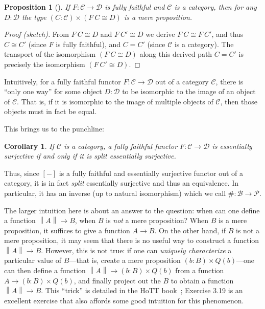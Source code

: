 \documentclass[preprint,authoryear]{sigplanconf}
\newcommand{\mcal}[1]{\ensuremath{\mathcal{#1}}}
\let\Sect\S
\renewcommand{\S}{\mcal S}
\newcommand{\iso}{\cong}              %
\newtheorem{prop}[thm]{Proposition}
\newtheorem{cor}[thm]{Corollary}
\theoremstyle{definition}
\theoremstyle{remark}
\newcommand{\sizesymb}{\#}
\newcommand{\size}[1]{\ensuremath{\sizesymb#1}}
\newcommand{\ptrunc}[1]{\ensuremath{\left\|#1\right\|}}
\newcommand{\CT}{\mcal{C}}
\newcommand{\DT}{\mcal{D}}
\newcommand{\BT}{\mcal{B}}
\newcommand{\PT}{\mcal{P}}
\newcommand{\fin}[1]{\ensuremath{[#1]}}
\begin{document}
\begin{prop}[]
  If $F : \CT \to \DT$ is fully faithful and $\CT$ is a category, then
  for any $D : \DT$ the type $(C : \CT) \times (F\ C \iso D)$ is a
  mere proposition.
\end{prop}

\begin{proof}[Proof (sketch)]
  From $F\ C \iso D$ and $F\ C' \iso D$ we derive $F\ C \iso F\
  C'$, and thus $C \iso C'$ (since $F$ is fully faithful), and $C =
  C'$ (since $\CT$ is a category).  The transport of the isomorphism
  $(F\ C \iso D)$ along this derived path $C = C'$ is precisely the
  isomorphism $(F\ C' \iso D)$.
\end{proof}

Intuitively, for a fully faithful functor $F : \CT \to \DT$ out of a
category $\CT$, there is ``only one way'' for some object $D : \DT$ to
be isomorphic to the image of an object of $\CT$.  That is, if it is
isomorphic to the image of multiple objects of $\CT$, then those
objects must in fact be equal.

This brings us to the punchline:

\begin{cor}
  If $\CT$ is a category, a fully faithful functor $F : \CT \to \DT$
  is essentially surjective if and only if it is split essentially surjective.
\end{cor}

Thus, since $\fin -$ is a fully faithful and essentially surjective
functor out of a category, it is in fact \emph{split} essentially
surjective and thus an equivalence.  In particular, it has an inverse
(up to natural isomorphism) which we call $\size : \BT \to \PT$.

The larger intuition here is about an answer to the question: when can
one define a function $\ptrunc{A} \to B$, when $B$ is \emph{not} a
mere proposition?  When $B$ is a mere proposition, it suffices to give
a function $A \to B$.  On the other hand, if $B$ is not a mere
proposition, it may seem that there is no useful way to construct a
function $\ptrunc{A} \to B$.  However, this is not true: if one can
\emph{uniquely characterize} a particular value of $B$---that is,
create a mere proposition $(b : B) \times Q(b)$---one can then define
a function $\ptrunc{A} \to (b : B) \times Q(b)$ from a function $A \to
(b : B) \times Q(b)$, and finally project out the $B$ to obtain a
function $\ptrunc A \to B$.  This ``trick'' is detailed in the HoTT
book~\citep[\Sect 3.9]{hottbook}; Exercise 3.19 is an excellent
exercise that also affords some good intuition for this phenomenon.
\end{document}
